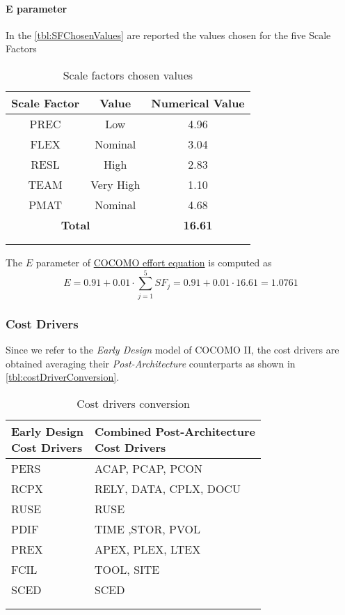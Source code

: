 \paragraph{E parameter}In the \autoref{tbl:SFChosenValues} are reported the values chosen for the five Scale Factors
\begin{longtable}{ccc}
\toprule
Scale Factor&Value&Numerical Value\\
\midrule
PREC&Low&4.96\\
FLEX&Nominal&3.04\\
RESL&High&2.83\\
TEAM&Very High&1.10\\
PMAT&Nominal&4.68\\
\midrule
\multicolumn{2}{c}{\textbf{Total}}&\textbf{16.61}\\
\bottomrule\\
\caption{\label{tbl:SFChosenValues}Scale factors chosen values}
\end{longtable}
The $E$ parameter of \hyperref[par:cocomoEquation]{COCOMO effort equation} is computed as
$$E = 0.91 + 0.01 \cdot \sum_{j=1}^{5}{SF_j} = 0.91+0.01\cdot 16.61 = 1.0761$$


\subsubsection{Cost Drivers}
Since we refer to the \emph{Early Design} model of COCOMO II, the cost drivers are obtained averaging their \emph{Post-Architecture} counterparts as shown in \autoref{tbl:costDriverConversion}.
\begin{longtable}{ll}
\toprule
\specialcell{Early Design\\Cost Drivers} & \specialcell{Combined Post-Architecture\\Cost Drivers}\\
\midrule
PERS&ACAP, PCAP, PCON\\
RCPX&RELY, DATA, CPLX, DOCU\\
RUSE&RUSE\\
PDIF&TIME ,STOR, PVOL\\
PREX&APEX, PLEX, LTEX\\
FCIL&TOOL, SITE\\
SCED&SCED\\
\bottomrule\\
\caption{\label{tbl:costDriverConversion}Cost drivers conversion}
\end{longtable}

